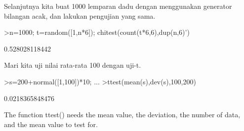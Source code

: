 \documentclass[a4paper,10pt]{article}
\begin{document}
\begin{eulernotebook}
\begin{eulercomment}
\begin{eulercomment}
\begin{eulercomment}
\begin{eulercomment}
\begin{eulercomment}
\begin{eulercomment}
\begin{eulercomment}
\begin{eulercomment}
\begin{eulercomment}
\begin{eulercomment}
\begin{eulercomment}
\begin{eulercomment}
\begin{eulercomment}
\begin{eulercomment}
\begin{eulercomment}
\begin{eulercomment}
\begin{eulercomment}
\begin{eulercomment}
\begin{eulercomment}
\begin{eulercomment}
\begin{eulercomment}
\begin{eulercomment}
\begin{eulercomment}
\begin{eulercomment}
\begin{eulercomment}
\begin{eulercomment}
\begin{eulercomment}
\begin{eulercomment}
\begin{eulercomment}
\begin{eulercomment}
\begin{eulercomment}
\begin{eulercomment}
\begin{eulercomment}
\begin{eulercomment}
\begin{eulercomment}
\begin{eulercomment}
\begin{eulercomment}
\begin{eulercomment}
\begin{eulercomment}
\begin{eulercomment}
\begin{eulercomment}
\begin{eulercomment}
\begin{eulercomment}
\begin{eulercomment}
\begin{eulercomment}
Selanjutnya kita buat 1000 lemparan dadu dengan menggunakan generator
bilangan acak, dan lakukan pengujian yang sama.
\end{eulercomment}
\begin{eulerprompt}
>n=1000; t=random([1,n*6]); chitest(count(t*6,6),dup(n,6)')
\end{eulerprompt}
\begin{euleroutput}
  0.528028118442
\end{euleroutput}
\begin{eulercomment}
Mari kita uji nilai rata-rata 100 dengan uji-t.
\end{eulercomment}
\begin{eulerprompt}
>s=200+normal([1,100])*10; ...
>ttest(mean(s),dev(s),100,200)
\end{eulerprompt}
\begin{euleroutput}
  0.0218365848476
\end{euleroutput}
\begin{eulercomment}
The function ttest() needs the mean value, the deviation, the number
of data, and the mean value to test for.


\end{eulercomment}
\end{eulercomment}
\end{eulercomment}
\end{eulercomment}
\end{eulercomment}
\end{eulercomment}
\end{eulercomment}
\end{eulercomment}
\end{eulercomment}
\end{eulercomment}
\end{eulercomment}
\end{eulercomment}
\end{eulercomment}
\end{eulercomment}
\end{eulercomment}
\end{eulercomment}
\end{eulercomment}
\end{eulercomment}
\end{eulercomment}
\end{eulercomment}
\end{eulercomment}
\end{eulercomment}
\end{eulercomment}
\end{eulercomment}
\end{eulercomment}
\end{eulercomment}
\end{eulercomment}
\end{eulercomment}
\end{eulercomment}
\end{eulercomment}
\end{eulercomment}
\end{eulercomment}
\end{eulercomment}
\end{eulercomment}
\end{eulercomment}
\end{eulercomment}
\end{eulercomment}
\end{eulercomment}
\end{eulercomment}
\end{eulercomment}
\end{eulercomment}
\end{eulercomment}
\end{eulercomment}
\end{eulercomment}
\end{eulercomment}
\end{eulernotebook}
\end{document}
